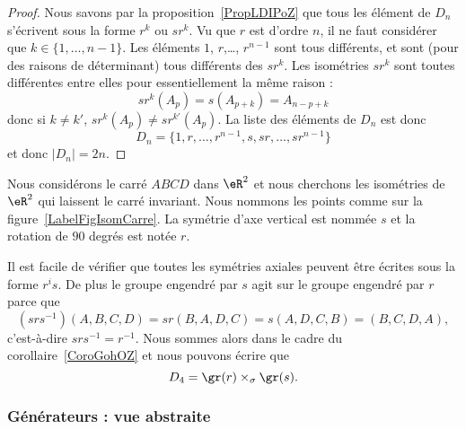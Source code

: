\begin{proof}
    Nous savons par la proposition~\ref{PropLDIPoZ} que tous les élément de \( D_n\) s'écrivent sous la forme \( r^k\) ou \( sr^k\). Vu que \( r\) est d'ordre \( n\), il ne faut considérer que \( k\in\{ 1,\ldots, n-1 \}\). Les éléments \( 1\), \( r\),\ldots, \( r^{n-1}\) sont tous différents, et sont (pour des raisons de déterminant) tous différents des \( sr^k\). Les isométries \( sr^k\) sont toutes différentes entre elles pour essentiellement la même raison :
    \begin{equation}
        sr^k(A_p)=s(A_{p+k})=A_{n-p+k}
    \end{equation}
    donc si \( k\neq k'\), \( sr^k(A_p)\neq sr^{k'}(A_p)\). La liste des éléments de \( D_n\) est donc
    \begin{equation}
        D_n=\{ 1,r,\ldots, r^{n-1},s,sr,\ldots, sr^{n-1} \}
    \end{equation}
    et donc \( | D_n |=2n\).
\end{proof}

\begin{example}     \label{EXooHNYYooUDsKnm}
    Nous considérons le carré \( ABCD\) dans \( \eR^2\) et nous cherchons les isométries de \( \eR^2\) qui laissent le carré invariant. Nous nommons les points comme sur la figure~\ref{LabelFigIsomCarre}. La symétrie d'axe vertical est nommée \( s\) et la rotation de \( 90\) degrés est notée \( r\).
    \newcommand{\CaptionFigIsomCarre}{Le carré dont nous étudions le groupe diédral.}
    

    Il est facile de vérifier que toutes les symétries axiales peuvent être écrites sous la forme \( r^is\). De plus le groupe engendré par \( s\) agit sur le groupe engendré par \( r\) parce que
    \begin{equation}
        (srs^{-1})(A,B,C,D)=sr(B,A,D,C)=s(A,D,C,B)=(B,C,D,A),
    \end{equation}
    c'est-à-dire \( srs^{-1}=r^{-1}\). Nous sommes alors dans le cadre du corollaire~\ref{CoroGohOZ} et nous pouvons écrire que
    \begin{equation}
        D_4=\gr(r)\times_{\sigma}\gr(s).
    \end{equation}
\end{example}

\subsubsection{Générateurs : vue abstraite}

